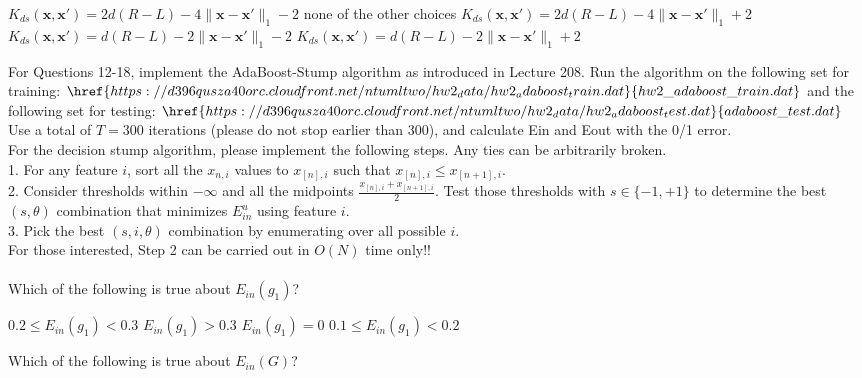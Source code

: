 \documentclass[a4paper,10pt]{exam}
\begin{document}
\begin{questions}
\begin{choices}
	\choice $K_{ds}(\mathbf{x}, \mathbf{x}') = 2d(R-L) - 4\|\mathbf{x}-\mathbf{x}'\|_1 - 2$
	\choice none of the other choices
	\CorrectChoice $K_{ds}(\mathbf{x}, \mathbf{x}') = 2d(R-L) - 4\|\mathbf{x}-\mathbf{x}'\|_1 + 2$
	\choice $K_{ds}(\mathbf{x}, \mathbf{x}') = d(R-L) - 2\|\mathbf{x}-\mathbf{x}'\|_1 - 2$
	\choice $K_{ds}(\mathbf{x}, \mathbf{x}') = d(R-L) - 2\|\mathbf{x}-\mathbf{x}'\|_1 + 2$\\
\end{choices}

\question For Questions 12-18, implement the AdaBoost-Stump algorithm as introduced in Lecture 208. Run the algorithm on the following set for training: $\href{https://d396qusza40orc.cloudfront.net/ntumltwo/hw2_data/hw2_adaboost_train.dat}{hw2\_adaboost\_train.dat}$ and the following set for testing: $\href{https://d396qusza40orc.cloudfront.net/ntumltwo/hw2_data/hw2_adaboost_test.dat}{adaboost\_test.dat}$\\
Use a total of $T=300$ iterations (please do not stop earlier than 300), and calculate Ein and Eout with the 0/1 error.\\
For the decision stump algorithm, please implement the following steps. Any ties can be arbitrarily broken. \\
1. For any feature $i$, sort all the $x_{n, i}$ values to $x_{[n], i}$ such that $x_{[n], i} \le x_{[n+1], i}$. \\
2. Consider thresholds within $-\infty$ and all the midpoints $\frac{x_{[n], i} + x_{[n+1], i}}{2}$. Test those thresholds with $s \in \{-1, +1\}$ to determine the best $(s,\theta)$ combination that minimizes $E_{in}^u$ using feature $i$. \\
3. Pick the best $(s,i,θ)$ combination by enumerating over all possible $i$.\\
For those interested, Step 2 can be carried out in $O(N)$ time only!!\\ \\
Which of the following is true about $E_{in}(g_1)$?

\begin{choices} 
    \CorrectChoice $0.2 \le E_{in}(g_1) < 0.3$
	\choice $E_{in}(g_1) > 0.3$
	\choice $E_{in}(g_1) = 0$
	\choice $0.1 \le E_{in}(g_1) < 0.2$\\
\end{choices}

\question Which of the following is true about $E_{in}(G)$?


\end{questions}
\end{document}
